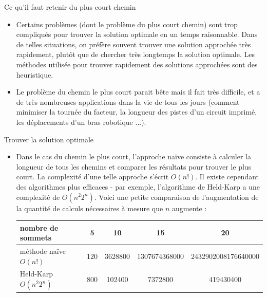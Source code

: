 \begin{frame}{Ce qu'il faut retenir du plus court chemin}
  
  \begin{itemize}
    \item Certains problèmes (dont le problème du plus court chemin) sont trop compliqués pour trouver la \alert{solution optimale} en un temps \alert{raisonnable}. Dans de telles situations, on préfère souvent trouver une solution approchée très rapidement, plutôt que de chercher très longtemps la solution optimale. Les méthodes utilisée pour trouver rapidement des solutions approchées sont des \alert{heuristique}.
    \item Le problème du chemin le plus court parait bête mais il fait très difficile, et a de très nombreuses applications dans la vie de tous les jours (comment minimiser la tournée du facteur, la longueur des pistes d'un circuit imprimé, les déplacements d'un bras robotique ...).
  \end{itemize}

  \begin{block}{Trouver la solution optimale}
    
    \begin{itemize}
      \item Dans le cas du chemin le plus court, l'approche naïve consiste à calculer la longueur de tous les chemins et comparer les résultats pour trouver le plus court. La complexité d'une telle approche s'écrit $O(n!)$. Il existe cependant des algorithmes plus efficaces - par exemple, l'algorithme de Held-Karp a une complexité de $O(n^{2}2^n)$. Voici une petite comparaison de l'augmentation de la quantité de calculs nécessaires à mesure que $n$ augmente :

      \bigskip

      \begin{center}
        \begin{tabular}{|l|cccc|}
          \hline
          nombre de sommets       & 5   & 10      & 15            & 20 \\
          \hline
          méthode naïve $O(n!)$   & 120 & 3628800 & 1307674368000 & 2432902008176640000 \\
          Held-Karp $O(n^{2}2^n)$ & 800 & 102400  & 7372800       & 419430400 \\
          \hline
        \end{tabular} 
      \end{center}

      \bigskip


\end{itemize}
\end{block}
\end{frame}
